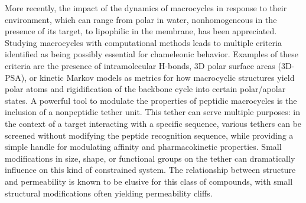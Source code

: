 More recently, the impact of the dynamics of macrocycles in response to their environment, which can range from polar in water, nonhomogeneous in the presence of its target, to lipophilic in the membrane, has been appreciated.\cite{Danelius2020, Witek2017, Riniker2019, Witek2019, Wang2021}
Studying macrocycles with computational methods leads to multiple criteria identified as being possibly essential for chameleonic behavior. Examples of these criteria are the presence of intramolecular H-bonds, 3D polar surface areas (3D-PSA), or kinetic Markov models as metrics for how macrocyclic structures yield polar atoms and rigidification of the backbone cycle into certain polar/apolar states. \cite{Witek2016, Witek2017, Tyagi2018, Witek2019, Wang2021}
A powerful tool to modulate the properties of peptidic macrocycles is the inclusion of a nonpeptidic tether unit.\cite{Marsault2007, Hoveyda2011, Roux2020} 
This tether can serve multiple purposes: in the context of a target interacting with a specific sequence, various tethers can be screened without modifying the peptide recognition sequence, while providing a simple handle for modulating affinity and pharmacokinetic properties. 
Small modifications in size, shape, or functional groups on the tether can dramatically influence on this kind of constrained system.\cite{Appavoo2019}
%
The relationship between structure and permeability is known to be elusive for this class of compounds, with small structural modifications often yielding permeability cliffs. \cite{Wang2014, Räder2018, Beck2012, White2011, Roux2020, Bockus2015, Hewitt2015, Rezai2006, Over2016}


